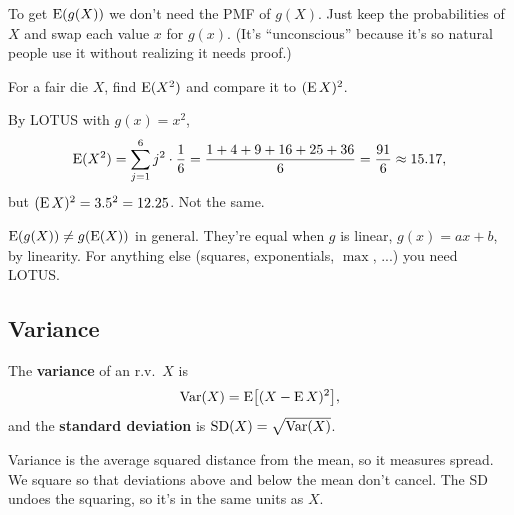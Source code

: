 \bigskip

\begin{intuition}
To get $\operatorname{E}(g(X))$ we don't need the PMF of $g(X)$. Just keep the probabilities of $X$ and swap each value $x$ for $g(x)$. (It's ``unconscious'' because it's so natural people use it without realizing it needs proof.)
\end{intuition}

\bigskip

\begin{example}\label{ex:dieE2}
For a fair die $X$, find $\operatorname{E}(X^{2})$ and compare it to $(\operatorname{E} X)^{2}$.
\end{example}

\medskip

\begin{solution}
By LOTUS with $g(x) = x^{2}$,
\medskip
\[
\operatorname{E}(X^{2}) = \sum_{j=1}^{6} j^{2} \cdot \frac{1}{6} = \frac{1 + 4 + 9 + 16 + 25 + 36}{6} = \frac{91}{6} \approx 15.17,
\]
\medskip
but $(\operatorname{E} X)^{2} = 3.5^{2} = 12.25$. Not the same.
\end{solution}

\bigskip

\begin{pitfall}
$\operatorname{E}(g(X)) \ne g(\operatorname{E}(X))$ in general. They're equal when $g$ is linear, $g(x) = ax + b$, by linearity. For anything else (squares, exponentials, $\max$, ...) you need LOTUS.
\end{pitfall}

\bigskip

\subsection{Variance}

\bigskip

\begin{definition}\label{def:variance}
The \textbf{variance} of an r.v.\ $X$ is
\medskip
\[
\operatorname{Var}(X) = \operatorname{E}\bigl[(X - \operatorname{E} X)^{2}\bigr],
\]
\medskip
and the \textbf{standard deviation} is $\operatorname{SD}(X) = \sqrt{\operatorname{Var}(X)}$.
\end{definition}

\bigskip

\begin{intuition}
Variance is the average squared distance from the mean, so it measures spread. We square so that deviations above and below the mean don't cancel. The SD undoes the squaring, so it's in the same units as $X$.
\end{intuition}

